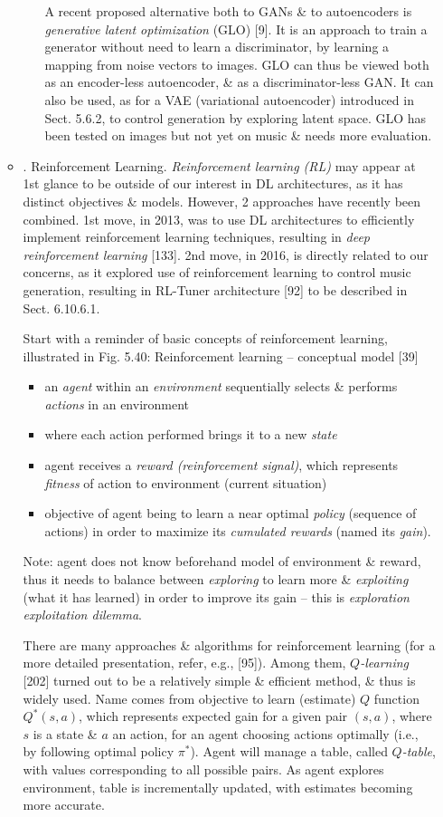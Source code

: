\documentclass{article}
\begin{document}
\begin{itemize}
\begin{itemize}
\begin{itemize}
			A recent proposed alternative both to GANs \& to autoencoders is {\it generative latent optimization} (GLO) [9]. It is an approach to train a generator without need to learn a discriminator, by learning a mapping from noise vectors to images. GLO can thus be viewed both as an encoder-less autoencoder, \& as a discriminator-less GAN. It can also be used, as for a VAE (variational autoencoder) introduced in Sect. 5.6.2, to control generation by exploring latent space. GLO has been tested on images but not yet on music \& needs more evaluation.
		\end{itemize}
		\item {. Reinforcement Learning.} {\it Reinforcement learning (RL)} may appear at 1st glance to be outside of our interest in DL architectures, as it has distinct objectives \& models. However, 2 approaches have recently been combined. 1st move, in 2013, was to use DL architectures to efficiently implement reinforcement learning techniques, resulting in {\it deep reinforcement learning} [133]. 2nd move, in 2016, is directly related to our concerns, as it explored use of reinforcement learning to control music generation, resulting in RL-Tuner architecture [92] to be described in Sect. 6.10.6.1.

		Start with a reminder of basic concepts of reinforcement learning, illustrated in {\sf Fig. 5.40: Reinforcement learning – conceptual model [39]}
		\begin{itemize}
			\item an {\it agent} within an {\it environment} sequentially selects \& performs {\it actions} in an environment
			\item where each action performed brings it to a new {\it state}
			\item agent receives a {\it reward (reinforcement signal)}, which represents {\it fitness} of action to environment (current situation)
			\item objective of agent being to learn a near optimal {\it policy} (sequence of actions) in order to maximize its {\it cumulated rewards} (named its {\it gain}).
		\end{itemize}
		Note: agent does not know beforehand model of environment \& reward, thus it needs to balance between {\it exploring} to learn more \& {\it exploiting} (what it has learned) in order to improve its gain -- this is {\it exploration exploitation dilemma}.

		There are many approaches \& algorithms for reinforcement learning (for a more detailed presentation, refer, e.g., [95]). Among them, {\it$Q$-learning} [202] turned out to be a relatively simple \& efficient method, \& thus is widely used. Name comes from objective to learn (estimate) $Q$ function $Q^*(s,a)$, which represents expected gain for a given pair $(s,a)$, where $s$ is a state \& $a$ an action, for an agent choosing actions optimally (i.e., by following optimal policy $\pi^*$). Agent will manage a table, called {\it$Q$-table}, with values corresponding to all possible pairs. As agent explores environment, table is incrementally updated, with estimates becoming more accurate.


\end{itemize}
\end{itemize}
\end{document}
